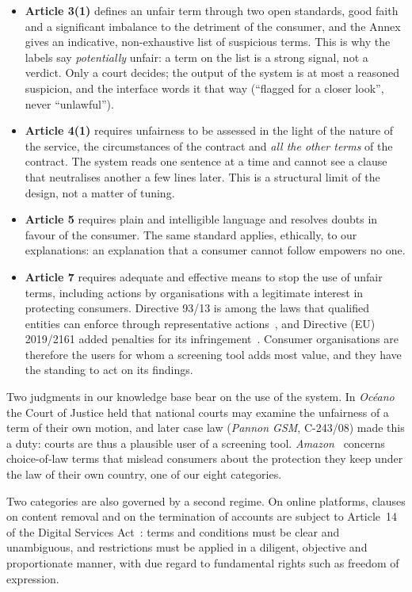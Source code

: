 \begin{itemize}
  \item \textbf{Article 3(1)} defines an unfair term through two open standards, good faith and a significant imbalance to the detriment of the consumer, and the Annex gives an indicative, non-exhaustive list of suspicious terms. This is why the labels say \emph{potentially} unfair: a term on the list is a strong signal, not a verdict. Only a court decides; the output of the system is at most a reasoned suspicion, and the interface words it that way (``flagged for a closer look'', never ``unlawful'').
  \item \textbf{Article 4(1)} requires unfairness to be assessed in the light of the nature of the service, the circumstances of the contract and \emph{all the other terms} of the contract. The system reads one sentence at a time and cannot see a clause that neutralises another a few lines later. This is a structural limit of the design, not a matter of tuning.
  \item \textbf{Article 5} requires plain and intelligible language and resolves doubts in favour of the consumer. The same standard applies, ethically, to our explanations: an explanation that a consumer cannot follow empowers no one.
  \item \textbf{Article 7} requires adequate and effective means to stop the use of unfair terms, including actions by organisations with a legitimate interest in protecting consumers. Directive 93/13 is among the laws that qualified entities can enforce through representative actions~\citep{rad2020}, and Directive (EU) 2019/2161 added penalties for its infringement~\citep{dir2019_2161}. Consumer organisations are therefore the users for whom a screening tool adds most value, and they have the standing to act on its findings.
\end{itemize}

Two judgments in our knowledge base bear on the use of the system. In \emph{Oc\'eano}~\citep{cjeu_oceano} the Court of Justice held that national courts may examine the unfairness of a term of their own motion, and later case law (\emph{Pannon GSM}, C-243/08) made this a duty: courts are thus a plausible user of a screening tool. \emph{Amazon}~\citep{cjeu_amazon} concerns choice-of-law terms that mislead consumers about the protection they keep under the law of their own country, one of our eight categories.

Two categories are also governed by a second regime. On online platforms, clauses on content removal and on the termination of accounts are subject to Article~14 of the Digital Services Act~\citep{dsa2022}: terms and conditions must be clear and unambiguous, and restrictions must be applied in a diligent, objective and proportionate manner, with due regard to fundamental rights such as freedom of expression.

